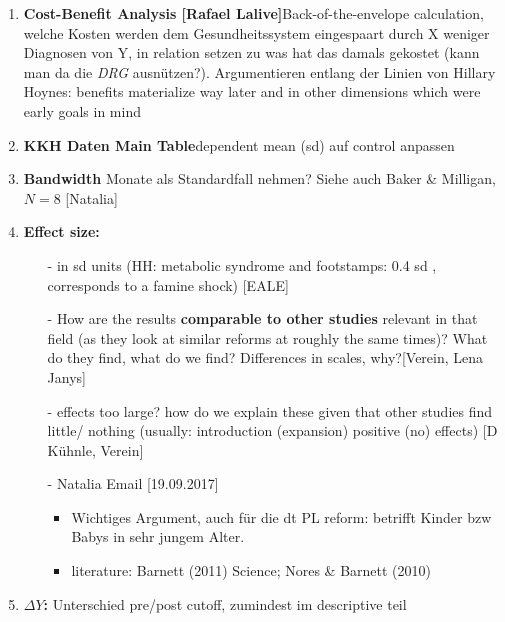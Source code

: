 \documentclass[11pt,a4paper]{article}
\begin{document}
{\begin{enumerate}
\item \textbf{Cost-Benefit Analysis [Rafael Lalive]}\newline Back-of-the-envelope calculation, welche Kosten werden dem Gesundheitssystem eingespaart durch X weniger Diagnosen von Y, in relation setzen zu was hat das damals gekostet (kann man da die \textit{DRG} ausnützen?). Argumentieren entlang der Linien von Hillary Hoynes: benefits materialize way later and in other dimensions which were early goals in mind


\item \textbf{KKH Daten Main Table}\newline dependent mean (sd) auf control anpassen


\item \textbf{Bandwidth} Monate als Standardfall nehmen? \newline
Siehe auch Baker \& Milligan, $N=8$ [Natalia]


\item \textbf{Effect size:}\vspace{-1em}
\begin{itemize}
	\item[-]in sd units (HH: metabolic syndrome and footstamps: 0.4 sd , corresponds to a famine 	shock) [EALE]
	\item[-] How are the results \textbf{comparable to other studies} relevant in that field (as 	they look at similar reforms at roughly the same times)? What do they find, what do we find? 	Differences in scales, why?[Verein, Lena Janys]
	\item[-] effects too large? how do we explain these given that other studies find little/	nothing (usually: introduction (expansion) positive (no) effects) [D Kühnle, Verein]
	\item[-] Natalia Email [19.09.2017]\vspace{-0.5em}
	\begin{itemize}
		\item Wichtiges Argument, auch für die dt PL reform: betrifft Kinder bzw Babys in sehr 	jungem 	Alter.
		\item literature: Barnett (2011) Science; Nores \& Barnett (2010) 
	\end{itemize}
\end{itemize}


\item \textbf{$\Delta Y$:}\newline
Unterschied pre/post cutoff, zumindest im descriptive teil



\end{enumerate}}
\end{document}
